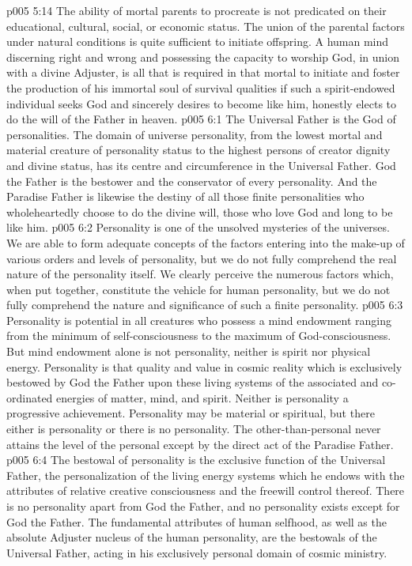 \vs p005 5:14 The ability of mortal parents to procreate is not predicated on their educational, cultural, social, or economic status. The union of the parental factors under natural conditions is quite sufficient to initiate offspring. A human mind discerning right and wrong and possessing the capacity to worship God, in union with a divine Adjuster, is all that is required in that mortal to initiate and foster the production of his immortal soul of survival qualities if such a spirit\hyp{}endowed individual seeks God and sincerely desires to become like him, honestly elects to do the will of the Father in heaven.
\vs p005 6:1 The Universal Father is the God of personalities. The domain of universe personality, from the lowest mortal and material creature of personality status to the highest persons of creator dignity and divine status, has its centre and circumference in the Universal Father. God the Father is the bestower and the conservator of every personality. And the Paradise Father is likewise the destiny of all those finite personalities who wholeheartedly choose to do the divine will, those who love God and long to be like him.
\vs p005 6:2 \pc Personality is one of the unsolved mysteries of the universes. We are able to form adequate concepts of the factors entering into the make\hyp{}up of various orders and levels of personality, but we do not fully comprehend the real nature of the personality itself. We clearly perceive the numerous factors which, when put together, constitute the vehicle for human personality, but we do not fully comprehend the nature and significance of such a finite personality.
\vs p005 6:3 Personality is potential in all creatures who possess a mind endowment ranging from the minimum of self\hyp{}consciousness to the maximum of God\hyp{}consciousness. But mind endowment alone is not personality, neither is spirit nor physical energy. Personality is that quality and value in cosmic reality which is exclusively bestowed by God the Father upon these living systems of the associated and co\hyp{}ordinated energies of matter, mind, and spirit. Neither is personality a progressive achievement. Personality may be material or spiritual, but there either is personality or there is no personality. The other\hyp{}than\hyp{}personal never attains the level of the personal except by the direct act of the Paradise Father.
\vs p005 6:4 The bestowal of personality is the exclusive function of the Universal Father, the personalization of the living energy systems which he endows with the attributes of relative creative consciousness and the freewill control thereof. There is no personality apart from God the Father, and no personality exists except for God the Father. The fundamental attributes of human selfhood, as well as the absolute Adjuster nucleus of the human personality, are the bestowals of the Universal Father, acting in his exclusively personal domain of cosmic ministry.
